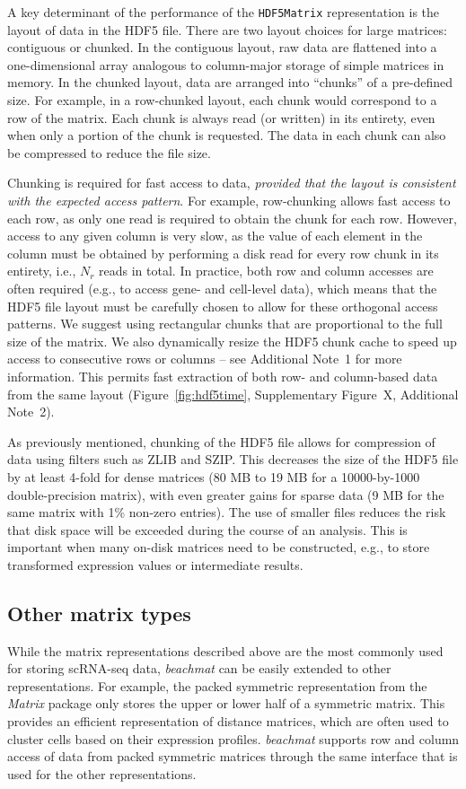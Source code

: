 \documentclass[10pt,letterpaper]{article}
\newcommand{\beachmat}{\textit{beachmat}}
\newcommand{\code}[1]{\texttt{#1}}
\begin{document}
A key determinant of the performance of the \code{HDF5Matrix} representation is the layout of data in the HDF5 file.
There are two layout choices for large matrices: contiguous or chunked.
In the contiguous layout, raw data are flattened into a one-dimensional array analogous to column-major storage of simple matrices in memory.
In the chunked layout, data are arranged into ``chunks'' of a pre-defined size.
For example, in a row-chunked layout, each chunk would correspond to a row of the matrix.
Each chunk is always read (or written) in its entirety, even when only a portion of the chunk is requested.
The data in each chunk can also be compressed to reduce the file size.

Chunking is required for fast access to data, \textit{provided that the layout is consistent with the expected access pattern}.
For example, row-chunking allows fast access to each row, as only one read is required to obtain the chunk for each row.
However, access to any given column is very slow, as the value of each element in the column must be obtained by performing a disk read for every row chunk in its entirety, i.e., $N_r$ reads in total.
In practice, both row and column accesses are often required (e.g., to access gene- and cell-level data), which means that the HDF5 file layout must be carefully chosen to allow for these orthogonal access patterns.
We suggest using rectangular chunks that are proportional to the full size of the matrix.
We also dynamically resize the HDF5 chunk cache to speed up access to consecutive rows or columns -- see Additional Note~1 for more information.
This permits fast extraction of both row- and column-based data from the same layout (Figure~\ref{fig:hdf5time}, Supplementary Figure~X, Additional Note~2).

As previously mentioned, chunking of the HDF5 file allows for compression of data using filters such as ZLIB and SZIP.
This decreases the size of the HDF5 file by at least 4-fold for dense matrices (80 MB to 19 MB for a 10000-by-1000 double-precision matrix), with even greater gains for sparse data (9 MB for the same matrix with 1\% non-zero entries).
The use of smaller files reduces the risk that disk space will be exceeded during the course of an analysis.
This is important when many on-disk matrices need to be constructed, e.g., to store transformed expression values or intermediate results.

\subsection*{Other matrix types}
While the matrix representations described above are the most commonly used for storing scRNA-seq data, \beachmat{} can be easily extended to other representations.
For example, the packed symmetric representation from the \textit{Matrix} package only stores the upper or lower half of a symmetric matrix.
This provides an efficient representation of distance matrices, which are often used to cluster cells based on their expression profiles.
\beachmat{} supports row and column access of data from packed symmetric matrices through the same interface that is used for the other representations.
\end{document}

